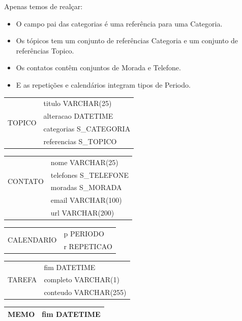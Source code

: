 \documentclass[a4paper,12pt]{article}
\begin{document}
	Apenas temos de realçar:

	\begin{itemize}
		\item O campo pai das categorias é uma referência para uma Categoria.
		\item Os tópicos tem um conjunto de referências Categoria e um conjunto de referências Topico.
		\item Os contatos contêm conjuntos de Morada e Telefone.
		\item E as repetições e calendários integram tipos de Periodo. 
	\end{itemize}

	\begin{multicols}{2}

		\begin{tabular}{|c|l|} \hline
			\multirow{4}{*}{TOPICO}
			& titulo VARCHAR(25) \\
			& alteracao DATETIME \\ 
			& categorias S\_CATEGORIA \\
			& referencias S\_TOPICO\\ \hline 
		\end{tabular}
		
		\begin{tabular}{|c|l|} \hline
			\multirow{4}{*}{CONTATO}
			& nome VARCHAR(25) \\
			& telefones S\_TELEFONE \\ 
			& moradas S\_MORADA \\
			& email VARCHAR(100) \\ 
			& url VARCHAR(200) \\ \hline 
		\end{tabular}
		
		\begin{tabular}{|c|l|} \hline
			\multirow{2}{*}{CALENDARIO}
			& p PERIODO \\
			& r REPETICAO \\ \hline 
		\end{tabular}
		
		\begin{tabular}{|c|l|} \hline
			\multirow{3}{*}{TAREFA}
			& fim DATETIME \\
			& completo VARCHAR(1) \\ 
			& conteudo VARCHAR(255) \\ \hline 
		\end{tabular}
		
		\begin{tabular}{|c|l|} \hline
			MEMO & fim DATETIME \\ \hline
		\end{tabular}
		

\end{multicols}
\end{document}
